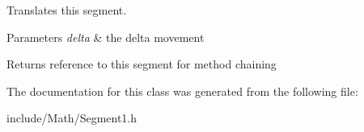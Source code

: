 Translates this segment.


\begin{DoxyParams}{Parameters}
{\em delta} & the delta movement \\
\hline
\end{DoxyParams}
\begin{DoxyReturn}{Returns}
reference to this segment for method chaining 
\end{DoxyReturn}


The documentation for this class was generated from the following file\+:\begin{DoxyCompactItemize}
\item 
include/\+Math/Segment1.\+h\end{DoxyCompactItemize}
